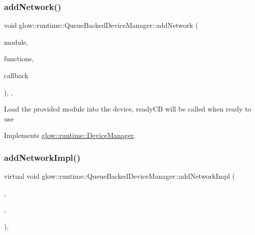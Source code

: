 \subsubsection{\texorpdfstring{add\+Network()}{addNetwork()}}
{\footnotesize\ttfamily void glow\+::runtime\+::\+Queue\+Backed\+Device\+Manager\+::add\+Network (\begin{DoxyParamCaption}\item[{const \hyperlink{classglow_1_1_module}{Module} $\ast$}]{module,  }\item[{Function\+Map\+Ty}]{functions,  }\item[{Ready\+C\+B\+Ty}]{callback }\end{DoxyParamCaption})\hspace{0.3cm}{\ttfamily [inline]}, {\ttfamily [override]}, {\ttfamily [virtual]}}

Load the provided module into the device, ready\+CB will be called when ready to use 

Implements \hyperlink{classglow_1_1runtime_1_1_device_manager_a9bbf9a88f8bf9ddc0ce63590580aa91f}{glow\+::runtime\+::\+Device\+Manager}.

\mbox{\label{classglow_1_1runtime_1_1_queue_backed_device_manager_a47a2b12e364f822961c904c7c123924a}} 
\subsubsection{\texorpdfstring{add\+Network\+Impl()}{addNetworkImpl()}}
{\footnotesize\ttfamily virtual void glow\+::runtime\+::\+Queue\+Backed\+Device\+Manager\+::add\+Network\+Impl (\begin{DoxyParamCaption}\item[{const \hyperlink{classglow_1_1_module}{Module} $\ast$}]{,  }\item[{Function\+Map\+Ty}]{,  }\item[{Ready\+C\+B\+Ty}]{ }\end{DoxyParamCaption})\hspace{0.3cm}{\ttfamily [protected]}, {}}



